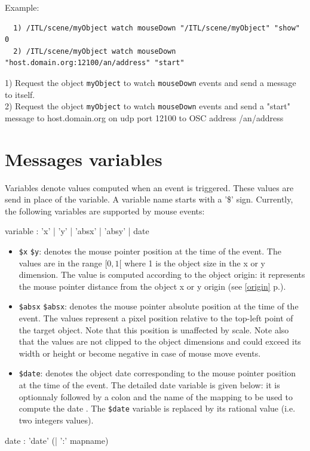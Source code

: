 \documentclass[a4paper,twoside]{report}
\newcommand{\sublevel}[1]	{\section{#1}}
\newcommand{\fullref}[1]	{\ref{#1} p.\pageref{#1}}
\newcommand{\OSC}[1]		{\texttt{#1}}
\begin{document}
Example:
\begin{verbatim}
  1) /ITL/scene/myObject watch mouseDown "/ITL/scene/myObject" "show" 0 
  2) /ITL/scene/myObject watch mouseDown "host.domain.org:12100/an/address" "start" 
\end{verbatim}
1) Request the object \OSC{myObject} to watch \OSC{mouseDown} events and send a message to itself. \\
2) Request the object \OSC{myObject} to watch \OSC{mouseDown} events and send a "start" message to host.domain.org on udp port 12100 to OSC address /an/address


\sublevel{Messages variables}
\label{interactvar}

Variables denote values computed when an event is triggered. These values are send in place of the variable. A variable name starts with a '\$' sign. Currently, the following variables are supported by mouse events:
\begin{rail} 
variable : 'x' | 'y' | 'absx' | 'absy' | date 
\end{rail}

\begin{itemize}
\item \OSC{\$x} \OSC{\$y}: denotes the mouse pointer position at the time of the event. The values are in the range $[0,1[$ where 1 is the object size in the x or y dimension. The value is computed according to the object origin: it represents the mouse pointer distance from the object x or y origin (see \fullref{origin}).
\item \OSC{\$absx} \OSC{\$absx}: denotes the mouse pointer absolute position at the time of the event. The values represent a pixel position relative to the top-left point of the target object. Note that this position is unaffected by scale. 
Note also that the values are not clipped to the object dimensions and could exceed its width or height or become negative in case of mouse move events.
\item \OSC{\$date}: denotes the object date corresponding to the mouse pointer position at the time of the event. The detailed date variable is given below: it is optionnaly followed by a colon and the name of the mapping to be used to compute the date . The \OSC{\$date} variable is replaced by its rational value (i.e. two integers values). 
\end{itemize}

\begin{rail} 
date : 'date' (| ':'  mapname)
\end{rail}
\end{document}
